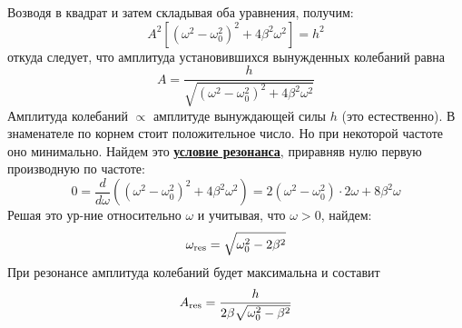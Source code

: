 Возводя в квадрат и затем складывая оба уравнения, получим:
\begin{displaymath}
A^2\left[\left(\omega^2\!\!-\omega_0^2\right)^2+4\beta^2\omega^2\right]=h^2
\end{displaymath}
откуда следует, что амплитуда установившихся вынужденных колебаний равна\vspace{-6mm}
\begin{displaymath}
A=\frac{h}{\sqrt{\left(\omega^2\!\!-\omega_0^2\right)^2+4\beta^2\omega^2}}
\end{displaymath}
Амплитуда колебаний $\propto$ амплитуде вынуждающей силы $h$ (это естественно). В знаменателе по корнем стоит положительное число. Но при некоторой частоте оно минимально. Найдем это \underline{\bf условие резонанса}, приравняв нулю первую производную по частоте:
\begin{displaymath}
0=\frac{d}{d\omega}\left(\left(\omega^2\!\!-\omega_0^2\right)^2+4\beta^2\omega^2\right)=
2\left(\omega^2\!\!-\omega_0^2\right)\cdot2\omega+8\beta^2\omega
\end{displaymath}
Решая это ур-ние относительно $\omega$ и учитывая, что $\omega>0$, найдем:
\begin{displaymath}
\omega_{\rm res}=\sqrt{\omega_0^2-2\beta^2}
\end{displaymath}
При резонансе амплитуда колебаний будет максимальна и составит
\begin{displaymath}
A_{\rm res}=\frac{h}{2\beta\sqrt{\omega_0^2-\beta^2}}
\end{displaymath}
